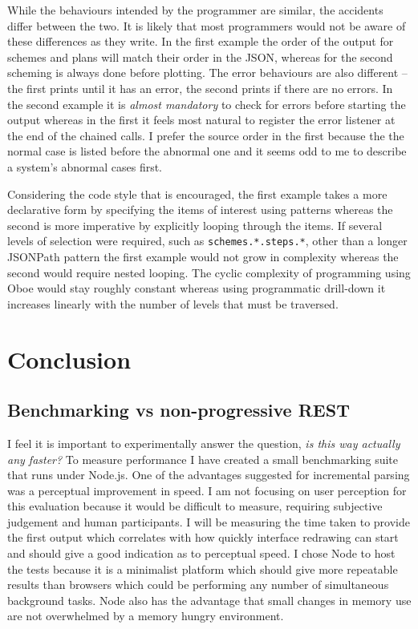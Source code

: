 \documentclass[12pt, ]{article}
\let\stdsection\section
\renewcommand\section{\newpage\stdsection}
\begin{document}
While the behaviours intended by the programmer are similar, the
accidents differ between the two. It is likely that most programmers
would not be aware of these differences as they write. In the first
example the order of the output for schemes and plans will match their
order in the JSON, whereas for the second scheming is always done before
plotting. The error behaviours are also different -- the first prints
until it has an error, the second prints if there are no errors. In the
second example it is \emph{almost mandatory} to check for errors before
starting the output whereas in the first it feels most natural to
register the error listener at the end of the chained calls. I prefer
the source order in the first because the the normal case is listed
before the abnormal one and it seems odd to me to describe a system's
abnormal cases first.

Considering the code style that is encouraged, the first example takes a
more declarative form by specifying the items of interest using patterns
whereas the second is more imperative by explicitly looping through the
items. If several levels of selection were required, such as
\texttt{schemes.*.steps.*}, other than a longer JSONPath pattern the
first example would not grow in complexity whereas the second would
require nested looping. The cyclic complexity of programming using Oboe
would stay roughly constant whereas using programmatic drill-down it
increases linearly with the number of levels that must be traversed.

\section{Conclusion}\label{conclusion}

\subsection{Benchmarking vs non-progressive
REST}\label{benchmarking-vs-non-progressive-rest}

I feel it is important to experimentally answer the question, \emph{is
this way actually any faster?} To measure performance I have created a
small benchmarking suite that runs under Node.js. One of the advantages
suggested for incremental parsing was a perceptual improvement in speed.
I am not focusing on user perception for this evaluation because it
would be difficult to measure, requiring subjective judgement and human
participants. I will be measuring the time taken to provide the first
output which correlates with how quickly interface redrawing can start
and should give a good indication as to perceptual speed. I chose Node
to host the tests because it is a minimalist platform which should give
more repeatable results than browsers which could be performing any
number of simultaneous background tasks. Node also has the advantage
that small changes in memory use are not overwhelmed by a memory hungry
environment.
\end{document}
